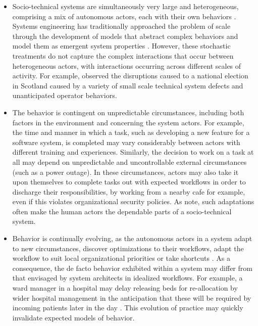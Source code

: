 \documentclass{llncs}
\begin{document}
\begin{itemize}
\item Socio-technical systems are simultaneously very large and heterogeneous, comprising a mix of autonomous actors,
  each with their own behaviors \cite{crabtree00ethnomethodologically}.  Systems engineering has traditionally
  approached the problem of scale through the development of models that abstract complex behaviors and model them as
  emergent system properties \cite{vespignani11model}.  However, these stochastic treatments do not capture the complex
  interactions that occur between heterogeneous actors, with interactions occurring across different scales of activity.
  For example, \citet{lock07observations} observed the disruptions caused to a national election in Scotland caused by a
  variety of small scale technical system defects and unanticipated operator behaviors.
\item The behavior is contingent on unpredictable circumstances, including both factors in the environment and
  concerning the system actors.  For example, the time and manner in which a task, such as developing a new feature for
  a software system, is completed may vary considerably between actors with different training and experiences.
  Similarly, the decision to work on a task at all may depend on unpredictable and uncontrollable external circumstances
  (such as a power outage).  In these circumstances, actors may also take it upon themselves to complete tasks out with
  expected workflows in order to discharge their responsibilities, by working from a nearby cafe for example, even if
  this violates organizational security policies.  As \citet{besnard03human} note, such adaptations often make the
  human actors the dependable parts of a socio-technical system.
\item Behavior is continually evolving, as the autonomous actors in a system adapt to new circumstances, discover
  optimizations to their workflows, adapt the workflow to suit local organizational priorities or take shortcuts
  \cite{anderson04heterogeneous,bonen79evolutionary,lyytinen2008explaining}.  As a consequence, the de facto behavior
  exhibited within a system may differ from that envisaged by system architects in idealized workflows.  For example, a
  ward manager in a hospital may delay releasing beds for re-allocation by wider hospital management in the anticipation
  that these will be required by incoming patients later in the day \citep{dewsbury07responsibility}.  This evolution of
  practice may quickly invalidate expected models of behavior.
\end{itemize}
\end{document}
